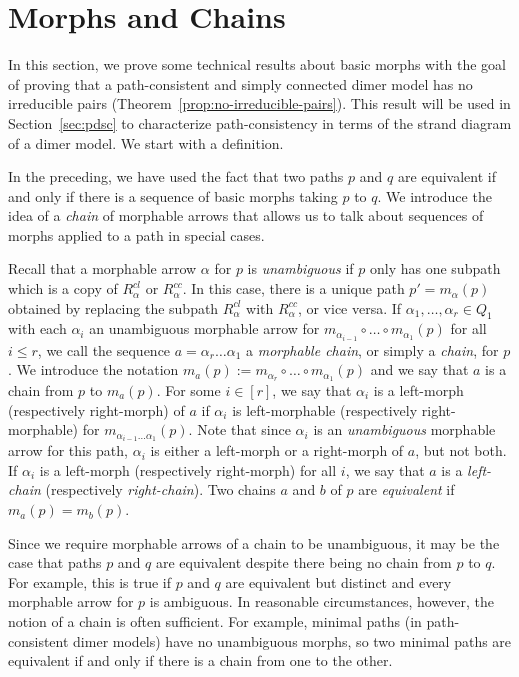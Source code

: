 \documentclass{article}
\theoremstyle{definition}
\begin{document}
\section{Morphs and Chains}\label{sec:morphsandchains}\label{sec:actual-argument}\label{sec:mac}

In this section, we prove some technical results about basic morphs with the goal of proving that a path-consistent and simply connected dimer model has no {irreducible pairs} (Theorem~\ref{prop:no-irreducible-pairs}). This result will be used in Section~\ref{sec:pdsc} to characterize path-consistency in terms of the strand diagram of a dimer model.
We start with a definition.

In the preceding, we have used the fact that two paths $p$ and $q$ are equivalent if and only if there is a sequence of basic morphs taking $p$ to $q$. We introduce the idea of a \textit{chain} of morphable arrows that allows us to talk about sequences of morphs applied to a path in special cases.

Recall that a morphable arrow $\alpha$ for $p$ is \emph{unambiguous} if $p$ only has one subpath which is a copy of $R_\alpha^{cl}$ or $R_\alpha^{cc}$. In this case, there is a unique path $p'=m_\alpha(p)$ obtained by replacing the subpath $R_\alpha^{cl}$ with $R_\alpha^{cc}$, or vice versa.
If $\alpha_1,\dots,\alpha_r\in Q_1$ with each $\alpha_i$ an unambiguous morphable arrow for $m_{\alpha_{i-1}}\circ\dots\circ m_{\alpha_1}(p)$ for all $i\leq r$, we call the sequence $a=\alpha_r\dots\alpha_1$ a \textit{morphable chain}, or simply a \textit{chain}, for $p$. 
We introduce the notation $m_{a}(p):=m_{\alpha_r}\circ\dots\circ m_{\alpha_1}(p)$ and we say that $a$ is a chain from $p$ to $m_a(p)$. 
For some $i\in[r]$, we say that $\alpha_i$ is a left-morph (respectively right-morph) of $a$ if $\alpha_i$ is left-morphable (respectively right-morphable) for $m_{\alpha_{i-1}\dots\alpha_{1}}(p)$. Note that since $\alpha_i$ is an \textit{unambiguous} morphable arrow for this path, $\alpha_i$ is either a left-morph or a right-morph of $a$, but not both. If $\alpha_i$ is a left-morph (respectively right-morph) for all $i$, we say that $a$ is a \textit{left-chain} (respectively \textit{right-chain}). 
Two chains $a$ and $b$ of $p$ are \textit{equivalent} if $m_a(p)=m_b(p)$. 

Since we require morphable arrows of a chain to be unambiguous, it may be the case that paths $p$ and $q$ are equivalent despite there being no chain from $p$ to $q$. For example, this is true if $p$ and $q$ are equivalent but distinct and every morphable arrow for $p$ is ambiguous. In reasonable circumstances, however, the notion of a chain is often sufficient. For example, minimal paths (in path-consistent dimer models) have no unambiguous morphs, so two minimal paths are equivalent if and only if there is a chain from one to the other.
\end{document}
